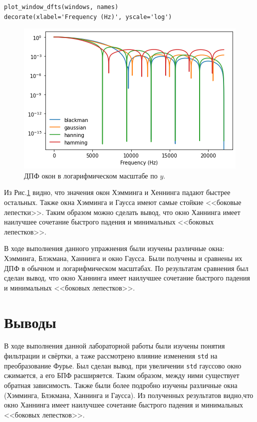 \documentclass[a4paper, 14pt]{extarticle}
\begin{document}
    \begin{lstlisting}[caption= Получение ДПФ окон в логарифмичесом масштабе по \texttt{y}., label={lst:task3_windows_dft_log}]
plot_window_dfts(windows, names)
decorate(xlabel='Frequency (Hz)', yscale='log')
    \end{lstlisting}

    \begin{figure}[h]
        \centering
        \includegraphics[width=0.8\linewidth]{resources/Images/task3_windows_dft_log}
        \caption{ДПФ окон в логарифмическом масштабе по $y$.}
        \label{fig:task3_windows_dft_log}
    \end{figure}

    Из Рис.\ref{fig:task3_windows_dft_log} видно, что значения окон Хэмминга и Хеннинга падают быстрее остальных.
    Также окна Хэмминга и Гаусса имеют самые стойкие <<боковые лепестки>>. Таким образом можно сделать вывод, что окно
    Ханнинга имеет наилучшее сочетание быстрого падения и минимальных <<боковых лепестков>>.

    В ходе выполнения данного упражнения были изучены различные окна: Хэмминга, Блэкмана, Ханнинга и окно Гаусса.
    Были получены и сравнены их ДПФ в обычном и логарифмическом масштабах. По результатам сравнения был сделан вывод, что
    окно Ханнинга имеет наилучшее сочетание быстрого падения и минимальных <<боковых лепестков>>.

    \newpage

    \section{Выводы}
    \label{sec:conclusions}

    В ходе выполнения данной лабораторной работы были изучены понятия фильтрации и свёртки, а таже  рассмотрено влияние
    изменения \texttt{std} на преобразование Фурье. Был сделан вывод, при увеличении \texttt{std} гауссово окно сжимается,
    а его БПФ расширяется. Таким образом, между ними существует обратная зависимость. Также были более подробно изучены
    различные окна (Хэмминга, Блэкмана, Ханнинга и Гаусса). Из полученных результатов видно,что окно Ханнинга имеет
    наилучшее сочетание быстрого падения и минимальных <<боковых лепестков>>.
\end{document}
